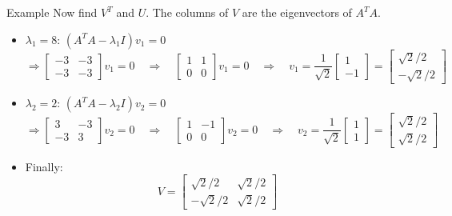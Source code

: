 \documentclass[10pt]{beamer}
\begin{document}
\begin{frame}{Example}
Now find $V^T$ and $U$.  The columns of $V$ are the eigenvectors of $A^T A$.
\begin{itemize}
    \item $\lambda_1=8$:  $(A^T A - \lambda_1 I) v_1 = 0$
\[
\Rightarrow 
\begin{bmatrix}
-3 & - 3\\
-3 & - 3
\end{bmatrix}
v_1 = 0
\quad
\Rightarrow 
\quad
\begin{bmatrix}
1 & 1\\
0 & 0
\end{bmatrix}
v_1 = 0
\quad
\Rightarrow 
\quad
v_1 = 
\frac{1}{\sqrt{2}}\begin{bmatrix}
1 \\
-1
\end{bmatrix}
=
\begin{bmatrix}
\sqrt{2}/2\\
-\sqrt{2}/2
\end{bmatrix}
\]
    \item $\lambda_2=2$:  $(A^T A - \lambda_2 I) v_2 = 0$
\[
\Rightarrow 
\begin{bmatrix}
 3 & - 3\\
-3 &   3
\end{bmatrix}
v_2 = 0
\quad
\Rightarrow 
\quad
\begin{bmatrix}
1 & -1\\
0 & 0
\end{bmatrix}
v_2 = 0
\quad
\Rightarrow 
\quad
v_2 = 
\frac{1}{\sqrt{2}}\begin{bmatrix}
1 \\
1
\end{bmatrix}
=
\begin{bmatrix}
\sqrt{2}/2\\
\sqrt{2}/2
\end{bmatrix}
\]
    \item Finally:
\[
V=
\begin{bmatrix}
\sqrt{2}/2 & \sqrt{2}/2\\
-\sqrt{2}/2  & \sqrt{2}/2
\end{bmatrix}
\]
\end{itemize}
\end{frame}
\end{document}
